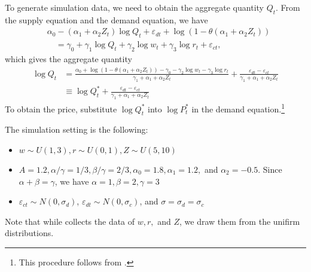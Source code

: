 \documentclass[11pt, a4paper]{article}
\numberwithin{figure}{section}
\theoremstyle{definition}
\newcommand{\0}{\mathbf{0}}
\begin{document}
To generate simulation data, we need to obtain the aggregate quantity $Q_t$.
From the supply equation and the demand equation, we have
\begin{align*}
   &\alpha_0 - (\alpha_1 + \alpha_2 Z_t)\log Q_t + \varepsilon_{dt} + \log (1 - \theta (\alpha_1 + \alpha_2 Z_t))\\
   &\quad = \gamma_0 + \gamma_1 \log Q_t +  \gamma_2 \log w_t + \gamma_3 \log r_t + \varepsilon_{ct},
\end{align*}
which gives the aggregate quantity 
\begin{align*}
    \log Q_t &= \frac{ \alpha_0 + \log (1 - \theta (\alpha_1 + \alpha_2 Z_t)) - \gamma_0  -  \gamma_2 \log w_t - \gamma_3 \log r_t}{\gamma_1+ \alpha_1 + \alpha_2 Z_t} + \frac{\varepsilon_{dt} - \varepsilon_{ct}}{\gamma_1+ \alpha_1 + \alpha_2 Z_t}\\
    &\equiv \log Q_t^* + \frac{\varepsilon_{dt} - \varepsilon_{ct}}{\gamma_1+ \alpha_1 + \alpha_2 Z_t}
\end{align*}
To obtain the price, substitute $\log Q_t^*$ into $\log P_t^*$ in the demand equation.\footnote{This procedure follows from \citet{perloff2012collinearity}.}

The simulation setting is the following:
\begin{itemize}
    \item $w \sim U(1,3), r \sim U(0,1), Z \sim U(5, 10)$
    \item $A = 1.2, \alpha/\gamma = 1/3, \beta/\gamma = 2/3, \alpha_0 = 1.8, \alpha_1 = 1.2,$ and $\alpha_2 = -0.5$. Since $\alpha + \beta = \gamma$, we have $\alpha = 1, \beta = 2, \gamma = 3$
    \item $\varepsilon_{ct}\sim N(0,\sigma_d)$, $\varepsilon_{dt} \sim N(0,\sigma_c)$, and $\sigma = \sigma_d = \sigma_c$
    
\end{itemize}
Note that while \citet{hyde1995can} collects the data of $w, r,$ and $Z$, we draw them from the unifirm distributions. 
\end{document}
